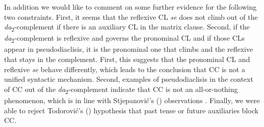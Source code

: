 In addition we would like to comment on some further evidence for the following two constraints. First, it seems that the reflexive CL \textit{se} does not climb out of the \textit{da}\textsubscript{2}-complement if there is an auxiliary CL in the matrix clause. Second, if the \textit{da}\textsubscript{2}-complement is reflexive and governs the pronominal CL and if those CLs appear in pseudodiaclisis, it is the pronominal one that climbs and the reflexive that stays in the complement. First, this suggests that the pronominal CL and reflexive \textit{se} behave differently, which leads to the conclusion that CC is not a unified syntactic mechanism. Second, examples of pseudodiaclisis in the context of CC out of the \textit{da}\textsubscript{2}-complement indicate that CC is not an all-or-nothing phenomenon, which is in line with Stjepanović’s (\citeyear[182]{Stjepanovic04}) observations \citep[pace][8]{Rezac05}. Finally, we were able to reject Todorović’s (\citeyear{Todorovic12}) hypothesis that past tense or future auxiliaries block CC.
